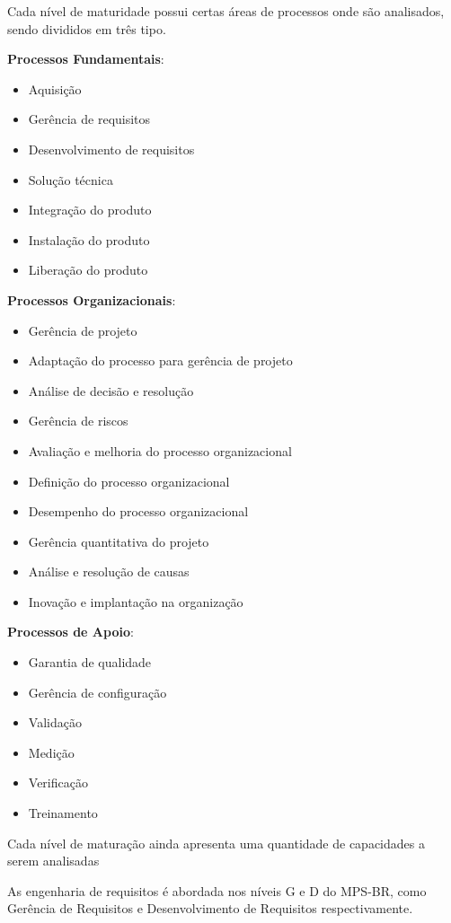 Cada nível de maturidade possui certas áreas de processos onde são analisados, sendo divididos
em três tipo.

\textbf{Processos Fundamentais}:
  \begin{itemize}
    \item Aquisição
    \item Gerência de requisitos
    \item Desenvolvimento de requisitos
    \item Solução técnica
    \item Integração do produto
    \item Instalação do produto
    \item Liberação do produto
  \end{itemize}


\textbf{Processos Organizacionais}:
\begin{itemize}
  \item Gerência de projeto
  \item Adaptação do processo para gerência de projeto
  \item Análise de decisão e resolução
  \item Gerência de riscos
  \item Avaliação e melhoria do processo organizacional
  \item Definição do processo organizacional
  \item Desempenho do processo organizacional
  \item Gerência quantitativa do projeto
  \item Análise e resolução de causas
  \item Inovação e implantação na organização
\end{itemize}

\textbf{Processos de Apoio}:
\begin{itemize}
  \item Garantia de qualidade
  \item Gerência de configuração
  \item Validação
  \item Medição
  \item Verificação
  \item Treinamento
\end{itemize}

Cada nível de maturação ainda apresenta uma quantidade de capacidades a serem analisadas

As engenharia de requisitos é abordada nos níveis G e D do MPS-BR, como Gerência de
Requisitos e Desenvolvimento de Requisitos respectivamente.

